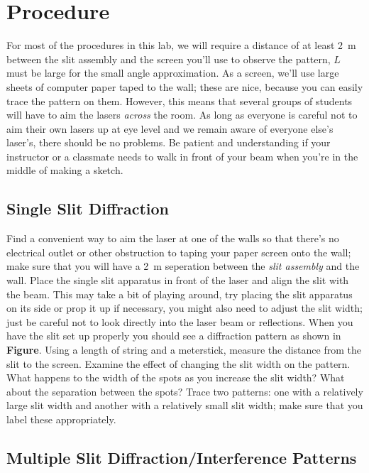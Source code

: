 \section{Procedure}

For most of the procedures in this lab, we will require a distance of at least
2~m between the slit assembly and the screen you'll use to observe the pattern,
$L$ must be large for the small angle approximation.  As a screen, we'll 
use large sheets of computer paper taped to the wall; these are nice, because 
you can easily trace the pattern on them.  However, this means that several 
groups of students will have to aim the lasers {\it across} the room.  As long
as everyone is careful not to aim their own lasers up at eye level and we 
remain aware of everyone else's laser's, there should be no problems.  Be 
patient and understanding if your instructor or a classmate needs to walk in
front of your beam when you're in the middle of making a sketch.

\subsection{Single Slit Diffraction}  

Find a convenient way to aim the laser at one of the walls so that there's
no electrical outlet or other obstruction to taping your paper screen onto the
wall; make sure that you will have a 2~m seperation between the {\it slit 
assembly} and the wall.  Place the single slit apparatus in front of the laser 
and align the slit with the beam. This may take a bit of playing around, try 
placing the slit apparatus on its side or prop it up if necessary, you might 
also need to adjust the slit width; just be careful not to look directly into 
the laser beam or reflections.  When you have the slit set up properly you 
should see a diffraction pattern as shown in {\bf Figure}. Using a length
of string and a meterstick, measure the distance from the slit to the screen.
Examine the effect of changing the slit width on the pattern.  What happens to 
the width of the spots as you increase the slit width? What about the 
separation between the spots? Trace two patterns: one with a relatively large 
slit width and another with a relatively small slit width; make sure that you 
label these appropriately.   

\subsection{Multiple Slit Diffraction/Interference Patterns} 
\label{sec:diff:multislit}

